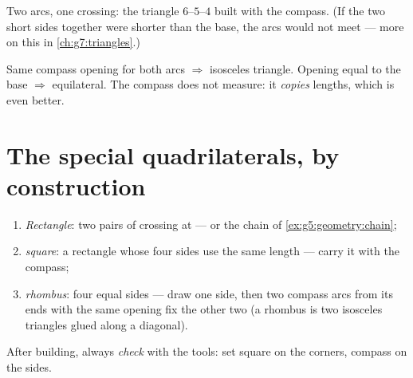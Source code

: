 \begin{omfigure}

{\small Two arcs, one crossing: the triangle $6$--$5$--$4$ built with
the compass. (If the two short sides together were shorter than the
base, the arcs would not meet --- more on this in
\cref{ch:g7:triangles}.)}
\end{omfigure}

\begin{example}\label{ex:g5:geometry:special}
Same compass opening for both arcs $\Rightarrow$ isosceles triangle.
Opening equal to the base $\Rightarrow$ equilateral. The compass
does not measure: it \emph{copies} lengths, which is even better.
\end{example}

\section{The special quadrilaterals, by construction}

\begin{method}\label{met:g5:geometry:quadrilaterals}
\begin{enumerate}
  \item \emph{Rectangle}: two pairs of  crossing at  --- or the chain of \cref{ex:g5:geometry:chain};
  \item \emph{square}: a rectangle whose four sides use the same
        length --- carry it with the compass;
  \item \emph{rhombus}: four equal sides --- draw one side, then two
        compass arcs from its ends with the same opening fix the
        other two  (a rhombus is two isosceles triangles
        glued along a diagonal).
\end{enumerate}
After building, always \emph{check} with the tools: set square on
the corners, compass on the sides.
\end{method}

